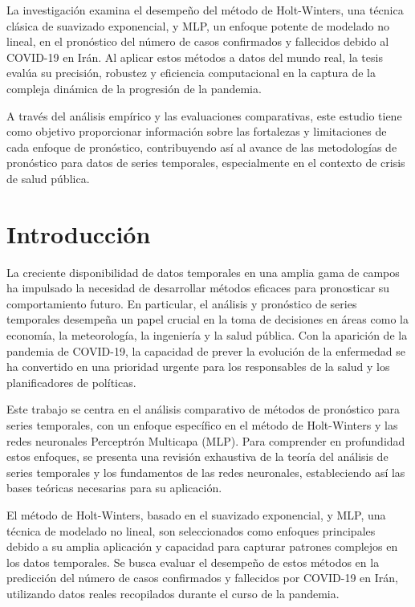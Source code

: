 \documentclass[
  us-letterpaper,
]{scrreprt}
\theoremstyle{definition}
\theoremstyle{plain}
\theoremstyle{plain}
\theoremstyle{definition}
\theoremstyle{remark}
\begin{document}
La investigación examina el desempeño del método de Holt-Winters, una
técnica clásica de suavizado exponencial, y MLP, un enfoque potente de
modelado no lineal, en el pronóstico del número de casos confirmados y
fallecidos debido al COVID-19 en Irán. Al aplicar estos métodos a datos
del mundo real, la tesis evalúa su precisión, robustez y eficiencia
computacional en la captura de la compleja dinámica de la progresión de
la pandemia.

A través del análisis empírico y las evaluaciones comparativas, este
estudio tiene como objetivo proporcionar información sobre las
fortalezas y limitaciones de cada enfoque de pronóstico, contribuyendo
así al avance de las metodologías de pronóstico para datos de series
temporales, especialmente en el contexto de crisis de salud pública.


\chapter*{Introducción}\label{introducciuxf3n}


La creciente disponibilidad de datos temporales en una amplia gama de
campos ha impulsado la necesidad de desarrollar métodos eficaces para
pronosticar su comportamiento futuro. En particular, el análisis y
pronóstico de series temporales desempeña un papel crucial en la toma de
decisiones en áreas como la economía, la meteorología, la ingeniería y
la salud pública. Con la aparición de la pandemia de COVID-19, la
capacidad de prever la evolución de la enfermedad se ha convertido en
una prioridad urgente para los responsables de la salud y los
planificadores de políticas.

Este trabajo se centra en el análisis comparativo de métodos de
pronóstico para series temporales, con un enfoque específico en el
método de Holt-Winters y las redes neuronales Perceptrón Multicapa
(MLP). Para comprender en profundidad estos enfoques, se presenta una
revisión exhaustiva de la teoría del análisis de series temporales y los
fundamentos de las redes neuronales, estableciendo así las bases
teóricas necesarias para su aplicación.

El método de Holt-Winters, basado en el suavizado exponencial, y MLP,
una técnica de modelado no lineal, son seleccionados como enfoques
principales debido a su amplia aplicación y capacidad para capturar
patrones complejos en los datos temporales. Se busca evaluar el
desempeño de estos métodos en la predicción del número de casos
confirmados y fallecidos por COVID-19 en Irán, utilizando datos reales
recopilados durante el curso de la pandemia.
\end{document}
